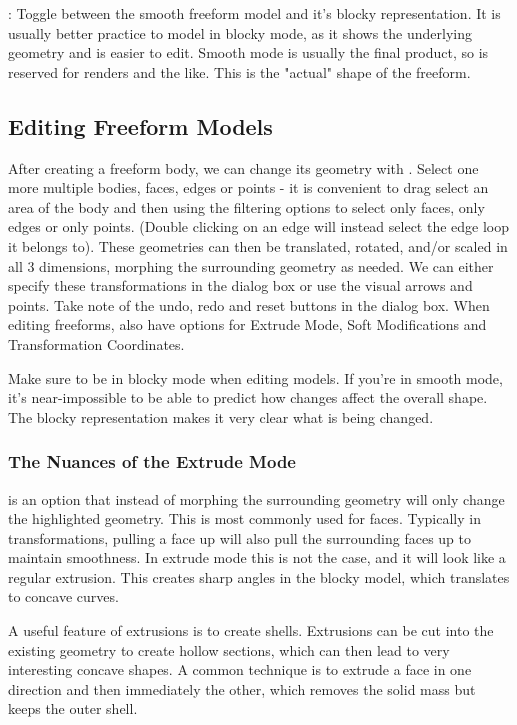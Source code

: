: \newline
Toggle between the smooth freeform model and it's blocky representation. It is usually better practice to model in blocky mode, as it shows the underlying geometry and is easier to edit. Smooth mode is usually the final product, so is reserved for renders and the like. This is the "actual" shape of the freeform.


\subsection{Editing Freeform Models}

After creating a freeform body, we can change its geometry with . Select one more multiple bodies, faces, edges or points - it is convenient to drag select an area of the body and then using the filtering options to select only faces, only edges or only points. (Double clicking on an edge will instead select the edge loop it belongs to). These geometries can then be translated, rotated, and/or scaled in all 3 dimensions, morphing the surrounding geometry as needed. We can either specify these transformations in the dialog box or use the visual arrows and points. Take note of the undo, redo and reset buttons in the dialog box. When editing freeforms, also have options for Extrude Mode, Soft Modifications and Transformation Coordinates.

Make sure to be in blocky mode when editing models. If you're in smooth mode, it's near-impossible to be able to predict how changes affect the overall shape. The blocky representation makes it very clear what is being changed.

\subsubsection{The Nuances of the Extrude Mode}
\mediumdifficulty
{} is an option that instead of morphing the surrounding geometry will only change the highlighted geometry. This is most commonly used for faces. Typically in transformations, pulling a face up will also pull the surrounding faces up to maintain smoothness. In extrude mode this is not the case, and it will look like a regular extrusion. This creates sharp angles in the blocky model, which translates to concave curves. 

A useful feature of extrusions is to create shells. Extrusions can be cut into the existing geometry to create hollow sections, which can then lead to very interesting concave shapes. A common technique is to extrude a face in one direction and then immediately the other, which removes the solid mass but keeps the outer shell.


